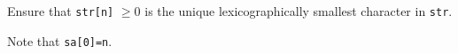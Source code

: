 Ensure that \texttt{str[n]} $\geq 0$ is the unique lexicographically smallest character in \texttt{str}.

Note that \texttt{sa[0]=n}.


